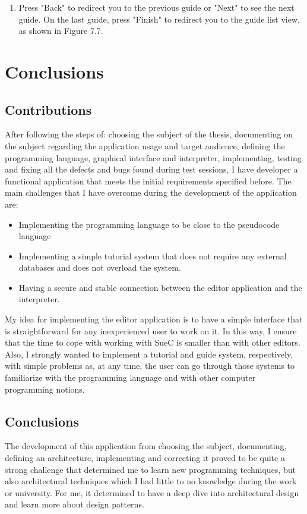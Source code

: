 \documentclass[12pt,a4paper,twoside]{report}
\begin{document}
\begin{enumerate}
\item Press "Back" to redirect you to the previous guide or "Next" to see the next guide. On the last guide, press "Finish" to redirect you to the guide list view, as shown in Figure 7.7.
\end{enumerate}
\chapter{Conclusions}

\section{Contributions}

After following the steps of: choosing the subject of the thesis, documenting on the subject regarding the application usage and target audience, defining the programming language, graphical interface and interpreter, implementing, testing and fixing all the defects and bugs found during test sessions, I have developer a functional application that meets the initial requirements specified before. The main challenges that I have overcome during the development of the application are: 
\begin{itemize}
 \item Implementing the programming language to be close to the pseudocode language
 \item Implementing a simple tutorial system that does not require any external databases and does not overload the system.
 \item Having a secure and stable connection between the editor application and the interpreter.
\end{itemize}

My idea for implementing the editor application is to have a simple interface that is straightforward for any inexperienced user to work on it. In this way, I ensure that the time to cope with working with SueC is smaller than with other editors. Also, I strongly wanted to implement a tutorial and guide system, respectively, with simple problems as, at any time, the user can go through those systems to familiarize with the programming language and with other computer programming notions.

\section{Conclusions}

The development of this application from choosing the subject, documenting, defining an architecture, implementing and correcting it proved to be quite a strong challenge that determined me to learn new programming techniques, but also architectural techniques which I had little to no knowledge during the work or university. For me, it determined to have a deep dive into architectural design and learn more about design patterns.
\end{document}
